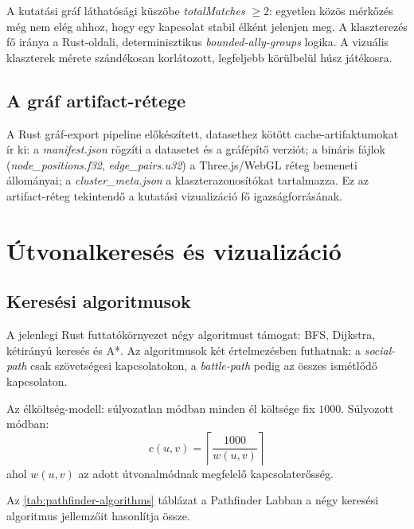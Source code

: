 A kutatási gráf láthatósági küszöbe \textit{totalMatches} $\geq 2$: egyetlen közös mérkőzés még nem elég ahhoz, hogy egy kapcsolat stabil élként jelenjen meg. A klaszterezés fő iránya a Rust-oldali, determinisztikus \textit{bounded-ally-groups} logika. A vizuális klaszterek mérete szándékosan korlátozott, legfeljebb körülbelül húsz játékosra.

\subsection{A gráf artifact-rétege}

A Rust gráf-export pipeline előkészített, datasethez kötött cache-artifaktumokat ír ki: a \textit{manifest.json} rögzíti a datasetet és a gráfépítő verziót; a bináris fájlok (\textit{node\_positions.f32}, \textit{edge\_pairs.u32}) a Three.js/WebGL réteg bemeneti állományai; a \textit{cluster\_meta.json} a klaszterazonosítókat tartalmazza. Ez az artifact-réteg tekintendő a kutatási vizualizáció fő igazságforrásának.

\section{Útvonalkeresés és vizualizáció}

\subsection{Keresési algoritmusok}

A jelenlegi Rust futtatókörnyezet négy algoritmust támogat: BFS, Dijkstra, kétirányú keresés és A*. Az algoritmusok két értelmezésben futhatnak: a \textit{social-path} csak szövetségesi kapcsolatokon, a \textit{battle-path} pedig az összes ismétlődő kapcsolaton.

Az élköltség-modell: súlyozatlan módban minden él költsége fix $1000$. Súlyozott módban:
\begin{equation}
c(u,v)=\left\lceil \frac{1000}{w(u,v)} \right\rceil
\end{equation}
ahol $w(u,v)$ az adott útvonalmódnak megfelelő kapcsolaterősség.

Az \ref{tab:pathfinder-algorithms} táblázat a Pathfinder Labban a négy keresési algoritmus jellemzőit hasonlítja össze.


